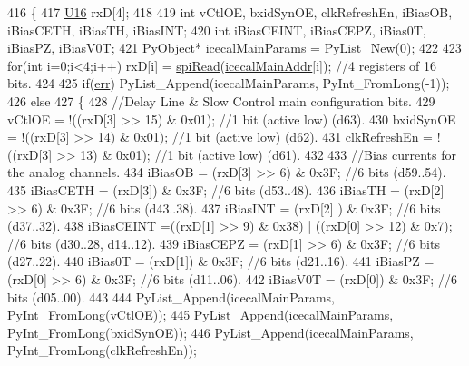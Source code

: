 \begin{DoxyCode}
416 \{                            
417     \hyperlink{ICECALv3_8h_adf928e51a60dba0df29d615401cc55a8}{U16} rxD[4];
418 
419     \textcolor{keywordtype}{int} vCtlOE, bxidSynOE, clkRefreshEn, iBiasOB, iBiasCETH, iBiasTH, iBiasINT;
420     \textcolor{keywordtype}{int} iBiasCEINT, iBiasCEPZ, iBias0T, iBiasPZ, iBiasV0T;
421     PyObject* icecalMainParams = PyList\_New(0);
422 
423     \textcolor{keywordflow}{for}(\textcolor{keywordtype}{int} i=0;i<4;i++) rxD[i] = \hyperlink{classICECALv3_aced41ce20a0853d6248b8df88412e57a}{spiRead}(\hyperlink{ICECALv3_8h_a9c22ae782814495416dc2b803df326c1}{icecalMainAddr}[i]);      \textcolor{comment}{//4 registers of 16
       bits.}
424 
425     \textcolor{keywordflow}{if}(\hyperlink{classICECALv3_ad8989925ee5b3ff322d863ce6aaff0bd}{err}) PyList\_Append(icecalMainParams, PyInt\_FromLong(-1));
426     \textcolor{keywordflow}{else}
427     \{
428         \textcolor{comment}{//Delay Line & Slow Control main configuration bits.}
429         vCtlOE              = !((rxD[3] >> 15) & 0x01);     \textcolor{comment}{//1 bit (active low) (d63).}
430         bxidSynOE           = !((rxD[3] >> 14) & 0x01);     \textcolor{comment}{//1 bit (active low) (d62).}
431         clkRefreshEn    = !((rxD[3] >> 13) & 0x01);     \textcolor{comment}{//1 bit (active low) (d61).}
432 
433         \textcolor{comment}{//Bias currents for the analog channels.}
434         iBiasOB             = (rxD[3] >> 6) & 0x3F;     \textcolor{comment}{//6 bits (d59..54).}
435         iBiasCETH           = (rxD[3])          & 0x3F;     \textcolor{comment}{//6 bits (d53..48).}
436         iBiasTH             = (rxD[2] >> 6) & 0x3F;     \textcolor{comment}{//6 bits (d43..38).}
437         iBiasINT            = (rxD[2] )         & 0x3F;     \textcolor{comment}{//6 bits (d37..32).}
438         iBiasCEINT      =((rxD[1] >> 9) & 0x38) | ((rxD[0] >> 12) & 0x7);       \textcolor{comment}{//6 bits (d30..28,
       d14..12).}
439         iBiasCEPZ           = (rxD[1] >> 6) & 0x3F;     \textcolor{comment}{//6 bits (d27..22).}
440         iBias0T             = (rxD[1])          & 0x3F;     \textcolor{comment}{//6 bits (d21..16).}
441         iBiasPZ             = (rxD[0] >> 6) & 0x3F;     \textcolor{comment}{//6 bits (d11..06).}
442         iBiasV0T            = (rxD[0])          & 0x3F;     \textcolor{comment}{//6 bits (d05..00).}
443 
444         PyList\_Append(icecalMainParams, PyInt\_FromLong(vCtlOE));
445         PyList\_Append(icecalMainParams, PyInt\_FromLong(bxidSynOE));
446         PyList\_Append(icecalMainParams, PyInt\_FromLong(clkRefreshEn));

\end{DoxyCode}
